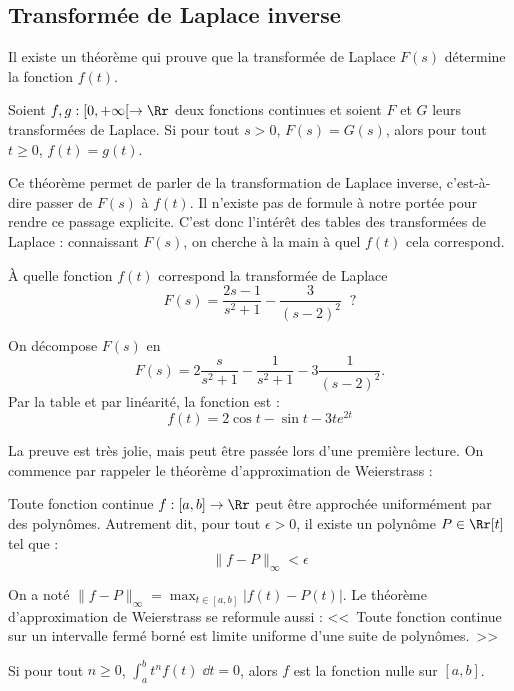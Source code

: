 \documentclass[class=report,crop=false]{standalone}
\begin{document}
\subsection{Transformée de Laplace inverse}

Il existe un théorème qui prouve que la transformée de Laplace $F(s)$ 
détermine la fonction $f(t)$. 

\begin{theoreme}
\label{th:laplaceunique}
Soient $f,g : [0,+\infty[ \to \Rr$ deux fonctions continues et soient
$F$ et $G$ leurs transformées de Laplace.
Si pour tout $s>0$, $F(s)=G(s)$,
alors pour tout $t \ge 0$, $f(t) = g(t)$.
\end{theoreme}


Ce théorème permet de parler de la transformation de Laplace inverse,
c'est-à-dire passer de $F(s)$ à $f(t)$.
Il n'existe pas de formule à notre portée pour rendre ce passage explicite.
C'est donc l'intérêt des tables des transformées de Laplace : connaissant $F(s)$,
on cherche à la main à quel $f(t)$ cela correspond.

\begin{exemple}
\`A quelle fonction $f(t)$ correspond la transformée de Laplace 
$$F(s) = \frac{2s-1}{s^2+1}-\frac{3}{(s-2)^2} \ \text{ ?}$$

On décompose $F(s)$ en 
$$F(s) = 2\frac{s}{s^2+1}-\frac{1}{s^2+1}-3\frac{1}{(s-2)^2}.$$
Par la table et par linéarité, la fonction est :
$$f(t) = 2 \cos t - \sin t -3t e^{2t}$$
\end{exemple}

La preuve est très jolie, mais peut être passée lors d'une première lecture.
On commence par rappeler le théorème d'approximation de Weierstrass :
\begin{theoreme}
Toute fonction continue $f : [a,b] \to \Rr$ peut être approchée 
uniformément par des polynômes.
Autrement dit, pour tout $\epsilon>0$, il existe un polynôme $P\in\Rr[t]$ tel que :
$$\| f -P \|_{\infty} < \epsilon$$ 
\end{theoreme}
On a noté $\| f -P \|_{\infty} = \max_{t\in [a,b]} \big| f(t) -P(t) \big|$.
Le théorème d'approximation de Weierstrass se reformule aussi :
<<~Toute fonction continue sur un intervalle fermé borné 
est limite uniforme d'une suite de polynômes.~>>


\begin{corollaire}
\label{cor:approxweirstrass}
Si pour tout $n\ge 0$, $\int_a^b t^n f(t) \;\dd t = 0$, alors
$f$ est la fonction nulle sur $[a,b]$.
\end{corollaire}
\end{document}
